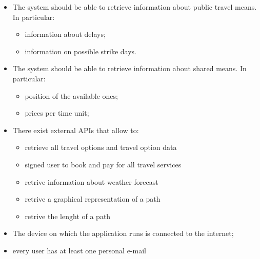 \begin{itemize}

\item The system should be able to retrieve information about public travel means. In particular:
\begin{itemize}
\item information about delays;
\item information on possible strike days.
\end{itemize}

\item The system should be able to retrieve information about shared means. In particular:
\begin{itemize}
\item position of the available ones;
\item prices per time unit;
\end{itemize}

\item There exist external APIs that allow to:
\begin{itemize}
\item retrieve all travel options and travel option data
\item signed user to book and pay for all travel services
\item retrive information about weather forecast
\item retrive a graphical representation of a path
\item retrive the lenght of a path
\end{itemize}


\item The device on which the application runs is connected to the internet;


\item every user has at least one personal e-mail 

\end{itemize}




